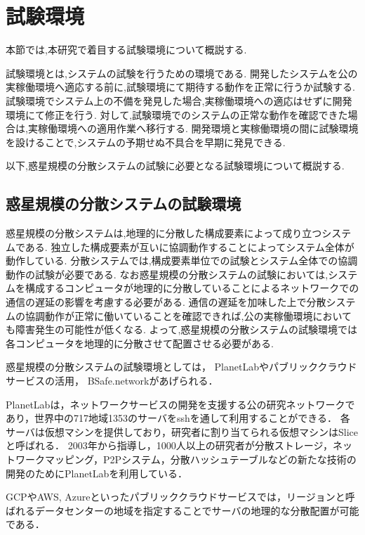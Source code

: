 \section{試験環境}
\label{bg:staging}

本節では,本研究で着目する試験環境について概説する.

試験環境とは,システムの試験を行うための環境である.
開発したシステムを公の実稼働環境へ適応する前に,試験環境にて期待する動作を正常に行うか試験する.
試験環境でシステム上の不備を発見した場合,実稼働環境への適応はせずに開発環境にて修正を行う.
対して,試験環境でのシステムの正常な動作を確認できた場合は,実稼働環境への適用作業へ移行する.
開発環境と実稼働環境の間に試験環境を設けることで,システムの予期せぬ不具合を早期に発見できる.

以下,惑星規模の分散システムの試験に必要となる試験環境について概説する.

\subsection{惑星規模の分散システムの試験環境}
\label{bg:staging:planetary-scale-distributed-system}

惑星規模の分散システムは,地理的に分散した構成要素によって成り立つシステムである.
独立した構成要素が互いに協調動作することによってシステム全体が動作している.
分散システムでは,構成要素単位での試験とシステム全体での協調動作の試験が必要である.
なお惑星規模の分散システムの試験においては,システムを構成するコンピュータが地理的に分散していることによるネットワークでの通信の遅延の影響を考慮する必要がある.
通信の遅延を加味した上で分散システムの協調動作が正常に働いていることを確認できれば,公の実稼働環境においても障害発生の可能性が低くなる.
よって,惑星規模の分散システムの試験環境では各コンピュータを地理的に分散させて配置させる必要がある.

惑星規模の分散システムの試験環境としては， PlanetLabやパブリッククラウドサービスの活用， BSafe.networkがあげられる．

PlanetLabは，ネットワークサービスの開発を支援する公の研究ネットワークであり，世界中の717地域1353のサーバをsshを通して利用することができる．
各サーバは仮想マシンを提供しており，研究者に割り当てられる仮想マシンはSliceと呼ばれる．
2003年から指導し，1000人以上の研究者が分散ストレージ，ネットワークマッピング，P2Pシステム，分散ハッシュテーブルなどの新たな技術の開発のためにPlanetLabを利用している．

GCPやAWS, Azureといったパブリッククラウドサービスでは，リージョンと呼ばれるデータセンターの地域を指定することでサーバの地理的な分散配置が可能である．

